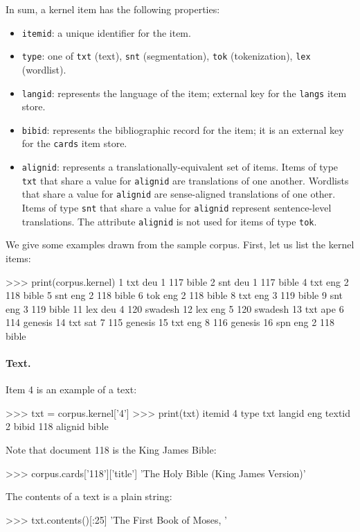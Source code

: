 In sum, a kernel item has the following properties:
\begin{itemize}
\item {\tt itemid}: a unique identifier for the item.
\item {\tt type}: one of {\tt txt} (text), {\tt snt} (segmentation),
   {\tt tok} (tokenization), {\tt lex} (wordlist).
\item {\tt langid}: represents the language of the item; external key for
  the {\tt langs} item store.
\item {\tt bibid}: represents the bibliographic record for the item; it
  is an external key for the {\tt cards} item store.
\item {\tt alignid}: represents a translationally-equivalent set of items.
  Items of type {\tt txt} that share a value for {\tt alignid}
  are translations of one another.  Wordlists that share a value
  for {\tt alignid} are sense-aligned translations of one other.
  Items of type {\tt snt} that share a value for {\tt alignid} represent
  sentence-level translations.  The attribute {\tt alignid} is not
  used for items of type {\tt tok}.
\end{itemize}

We give some examples drawn from the sample corpus.  First, let us
list the kernel items:
\begin{python}
>>> print(corpus.kernel)
1 txt deu 1 117 bible
2 snt deu 1 117 bible
4 txt eng 2 118 bible  
5 snt eng 2 118 bible
6 tok eng 2 118 bible
8 txt eng 3 119 bible  
9 snt eng 3 119 bible
11 lex deu 4 120 swadesh  
12 lex eng 5 120 swadesh  
13 txt ape 6 114 genesis  
14 txt sat 7 115 genesis  
15 txt eng 8 116 genesis  
16 spn eng 2 118 bible
\end{python}

\paragraph{Text.}
Item 4 is an example of a text:
\begin{python}
>>> txt = corpus.kernel['4']
>>> print(txt)
itemid 4
type   txt
langid eng
textid 2
bibid  118
alignid bible
\end{python}
Note that document 118 is the King James Bible:
\begin{python}
>>> corpus.cards['118']['title']
'The Holy Bible (King James Version)'
\end{python}
The contents of a text is a plain string:
\begin{python}
>>> txt.contents()[:25]
'The First Book of Moses, '
\end{python}

